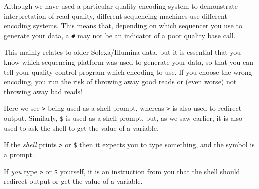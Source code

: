 \documentclass[
  letterpaper,
  DIV=11,
  numbers=noendperiod]{scrreprt}
\begin{document}
\begin{tcolorbox}[enhanced jigsaw, toptitle=1mm, breakable, bottomrule=.15mm, colback=white, toprule=.15mm, opacityback=0, bottomtitle=1mm, coltitle=black, opacitybacktitle=0.6, rightrule=.15mm, colframe=quarto-callout-note-color-frame, titlerule=0mm, colbacktitle=quarto-callout-note-color!10!white, title=\textcolor{quarto-callout-note-color}{\faInfo}\hspace{0.5em}{Quality encodings vary}, left=2mm, leftrule=.75mm, arc=.35mm]

Although we have used a particular quality encoding system to
demonstrate interpretation of read quality, different sequencing
machines use different encoding systems. This means that, depending on
which sequencer you use to generate your data, a \texttt{\#} may not be
an indicator of a poor quality base call.

This mainly relates to older Solexa/Illumina data, but it is essential
that you know which sequencing platform was used to generate your data,
so that you can tell your quality control program which encoding to use.
If you choose the wrong encoding, you run the risk of throwing away good
reads or (even worse) not throwing away bad reads!

\end{tcolorbox}

\begin{tcolorbox}[enhanced jigsaw, toptitle=1mm, breakable, bottomrule=.15mm, colback=white, toprule=.15mm, opacityback=0, bottomtitle=1mm, coltitle=black, opacitybacktitle=0.6, rightrule=.15mm, colframe=quarto-callout-note-color-frame, titlerule=0mm, colbacktitle=quarto-callout-note-color!10!white, title=\textcolor{quarto-callout-note-color}{\faInfo}\hspace{0.5em}{Same symbols but different meanings}, left=2mm, leftrule=.75mm, arc=.35mm]

Here we see \texttt{\textgreater{}} being used as a shell prompt,
whereas \texttt{\textgreater{}} is also used to redirect output.
Similarly, \texttt{\$} is used as a shell prompt, but, as we saw
earlier, it is also used to ask the shell to get the value of a
variable.

If the \emph{shell} prints \texttt{\textgreater{}} or \texttt{\$} then
it expects you to type something, and the symbol is a prompt.

If \emph{you} type \texttt{\textgreater{}} or \texttt{\$} yourself, it
is an instruction from you that the shell should redirect output or get
the value of a variable.

\end{tcolorbox}
\end{document}
